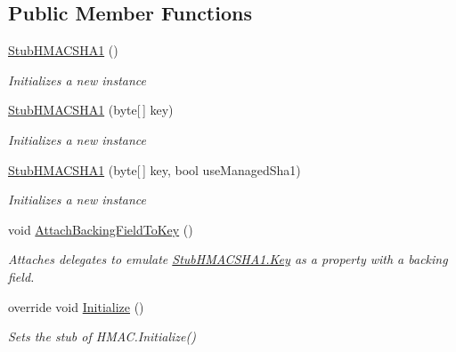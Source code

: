 \subsection*{Public Member Functions}
\begin{DoxyCompactItemize}
\item 
\hyperlink{class_system_1_1_security_1_1_cryptography_1_1_fakes_1_1_stub_h_m_a_c_s_h_a1_a5e49d2cd5233bb32504c135bdb8b40e4}{Stub\-H\-M\-A\-C\-S\-H\-A1} ()
\begin{DoxyCompactList}\small\item\em Initializes a new instance\end{DoxyCompactList}\item 
\hyperlink{class_system_1_1_security_1_1_cryptography_1_1_fakes_1_1_stub_h_m_a_c_s_h_a1_a7987ed77bdad3bb25c238dd1835a17e4}{Stub\-H\-M\-A\-C\-S\-H\-A1} (byte\mbox{[}$\,$\mbox{]} key)
\begin{DoxyCompactList}\small\item\em Initializes a new instance\end{DoxyCompactList}\item 
\hyperlink{class_system_1_1_security_1_1_cryptography_1_1_fakes_1_1_stub_h_m_a_c_s_h_a1_ac76be2329c609f9c03d58af832b1d912}{Stub\-H\-M\-A\-C\-S\-H\-A1} (byte\mbox{[}$\,$\mbox{]} key, bool use\-Managed\-Sha1)
\begin{DoxyCompactList}\small\item\em Initializes a new instance\end{DoxyCompactList}\item 
void \hyperlink{class_system_1_1_security_1_1_cryptography_1_1_fakes_1_1_stub_h_m_a_c_s_h_a1_a2ceba180a6474e32492c9c59e1e8558e}{Attach\-Backing\-Field\-To\-Key} ()
\begin{DoxyCompactList}\small\item\em Attaches delegates to emulate \hyperlink{class_system_1_1_security_1_1_cryptography_1_1_fakes_1_1_stub_h_m_a_c_s_h_a1_a4faac96367a6f03b98414b6445af664c}{Stub\-H\-M\-A\-C\-S\-H\-A1.\-Key} as a property with a backing field.\end{DoxyCompactList}\item 
override void \hyperlink{class_system_1_1_security_1_1_cryptography_1_1_fakes_1_1_stub_h_m_a_c_s_h_a1_a83ac6d994725a9cae97448efe16562de}{Initialize} ()
\begin{DoxyCompactList}\small\item\em Sets the stub of H\-M\-A\-C.\-Initialize()\end{DoxyCompactList}\end{DoxyCompactItemize}
